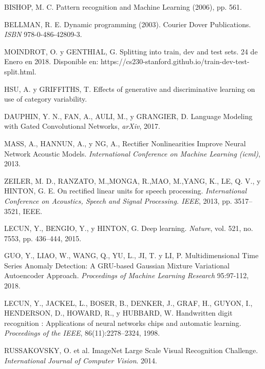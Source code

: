 \begin{thebibliography}{9}
BISHOP, M. C. Pattern recognition and Machine Learning (2006), pp. 561.

 BELLMAN, R. E. Dynamic programming (2003). Courier Dover Publications. \textit{ISBN} 978-0-486-42809-3.

 MOINDROT, O. y GENTHIAL, G. Splitting into train, dev and test sets. 24 de Enero en 2018. Disponible en: https://cs230-stanford.github.io/train-dev-test-split.html.

 HSU, A. y GRIFFITHS, T. Effects of generative and discriminative learning on use of category variability.

 DAUPHIN, Y. N., FAN, A., AULI, M., y GRANGIER, D. Language Modeling with Gated Convolutional Networks, \textit{arXiv}, 2017.

 MASS, A., HANNUN, A., y NG, A., Rectifier Nonlinearities Improve Neural Network Acoustic Models. \textit{International Conference on Machine Learning (icml)}, 2013.

 ZEILER, M. D., RANZATO, M.,MONGA, R.,MAO, M.,YANG, K., LE, Q. V., y HINTON, G. E. On rectified linear units for speech processing. \textit{International Conference on Acoustics, Speech and Signal Processing. IEEE}, 2013, pp. 3517–3521, IEEE.

 LECUN, Y., BENGIO, Y., y HINTON, G. Deep learning. \textit{Nature}, vol. 521, no. 7553, pp. 436–444, 2015.


 GUO, Y., LIAO, W., WANG, Q., YU, L., JI, T. y LI, P. Multidimensional Time Series Anomaly Detection: A GRU-based Gaussian Mixture Variational Autoencoder Approach. \textit{Proceedings of Machine Learning Research} 95:97-112, 2018.

 LECUN, Y., JACKEL, L., BOSER, B., DENKER, J., GRAF, H., GUYON, I., HENDERSON, D., HOWARD, R., y HUBBARD, W. Handwritten digit recognition : Applications of neural networks chips and automatic learning. \textit{Proceedings of the IEEE}, 86(11):2278–2324, 1998.

 RUSSAKOVSKY, O. et al. ImageNet Large Scale Visual Recognition Challenge. \textit{International Journal of Computer Vision}. 2014. 


\end{thebibliography}
